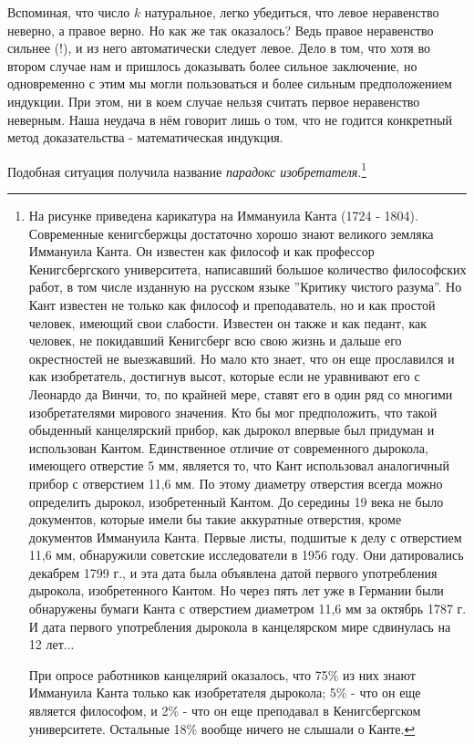 Вспоминая, что число $k$ натуральное, легко убедиться, что левое неравенство неверно, а правое верно. Но как же так оказалось? Ведь правое неравенство сильнее (!), и из него автоматически следует левое. Дело в том, что хотя во втором случае нам и пришлось доказывать более сильное заключение, но одновременно с этим мы могли пользоваться и более сильным предположением индукции. При этом, ни в коем случае нельзя считать первое неравенство неверным. Наша неудача в нём говорит лишь о том, что не годится конкретный метод доказательства - математическая индукция. 
\par
Подобная ситуация получила название \textit{парадокс изобретателя}.\footnote{На рисунке приведена карикатура на Иммануила Канта (1724 - 1804). Современные кенигсбержцы достаточно хорошо знают великого земляка Иммануила Канта. Он известен как философ и как профессор Кенигсбергского университета, написавший большое количество философских работ, в том числе изданную на русском языке ''Критику чистого разума''.
Но Кант известен не только как философ и преподаватель, но и как простой человек, имеющий свои слабости. Известен он также и как педант, как человек, не покидавший Кенигсберг всю свою жизнь и дальше его окрестностей не выезжавший. Но мало кто знает, что он еще прославился и как изобретатель, достигнув высот, которые если не уравнивают его с Леонардо да Винчи, то, по крайней мере, ставят его в один ряд со многими изобретателями мирового значения. Кто бы мог предположить, что такой обыденный канцелярский прибор, как дырокол впервые был придуман и использован Кантом. Единственное отличие от современного дырокола, имеющего отверстие 5 мм, является то, что Кант использовал аналогичный прибор с отверстием 11,6 мм. По этому диаметру отверстия всегда можно определить дырокол, изобретенный Кантом. До середины 19 века не было документов, которые имели бы такие аккуратные отверстия, кроме документов Иммануила Канта. Первые листы, подшитые к делу с отверстием 11,6 мм, обнаружили советские исследователи в 1956 году. Они датировались декабрем 1799 г., и эта дата была объявлена датой первого употребления дырокола, изобретенного Кантом. Но через пять лет уже в Германии были обнаружены бумаги Канта с отверстием диаметром 11,6 мм за октябрь 1787 г. И дата первого употребления дырокола в канцелярском мире сдвинулась на 12 лет...
\par
При опросе работников канцелярий оказалось, что 75\% из них знают Иммануила Канта только как изобретателя дырокола; 5\% - что он еще является философом, и 2\% - что он еще преподавал в Кенигсбергском университете. Остальные 18\% вообще ничего не слышали о Канте. \smiley}

